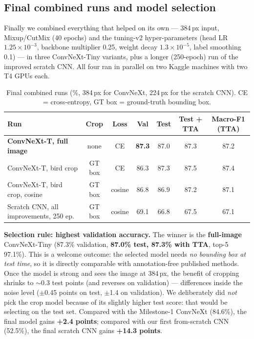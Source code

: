 \subsection{Final combined runs and model selection}\label{sec:finalruns}
Finally we combined everything that helped on its own --- 384\,px input, Mixup/CutMix (40 epochs) and the tuning-v2
hyper-parameters (head LR $1.25\!\times\!10^{-3}$, backbone multiplier 0.25, weight decay $1.3\!\times\!10^{-5}$, label smoothing 0.1)
--- in three ConvNeXt-Tiny variants, plus a longer (250-epoch) run of the improved scratch CNN. All four ran in parallel on
two Kaggle machines with two T4 GPUs each.

\begin{table}[H]\centering\small
\begin{tabular}{lcccccc}
\toprule
Run & Crop & Loss & \textbf{Val} & Test & Test + TTA & Macro-F1 (TTA)\\
\midrule
\textbf{ConvNeXt-T, full image} & none & CE & \textbf{87.3} & 87.0 & 87.3 & 87.2\\
ConvNeXt-T, bird crop & GT box & CE & 86.3 & 87.3 & 87.5 & 87.4\\
ConvNeXt-T, bird crop, cosine & GT box & cosine & 86.8 & 86.9 & 87.2 & 87.1\\
\midrule
Scratch CNN, all improvements, 250 ep. & GT box & cosine & 69.1 & 66.8 & 67.5 & 67.1\\
\bottomrule
\end{tabular}
\caption{Final combined runs (\%, 384\,px for ConvNeXt, 224\,px for the scratch CNN). CE = cross-entropy, GT box = ground-truth bounding box.}\label{tab:final}
\end{table}

\textbf{Selection rule: highest validation accuracy.} The winner is the \textbf{full-image} ConvNeXt-Tiny (87.3\% validation,
\textbf{87.0\% test, 87.3\% with TTA}, top-5 97.1\%). This is a welcome outcome: the selected model needs \emph{no bounding box at
test time}, so it is directly comparable with annotation-free published methods. Once the model is strong and sees the image at
384\,px, the benefit of cropping shrinks to $\sim$0.3 test points (and reverses on validation) --- differences inside the noise level
($\pm$0.45 points on test, $\pm$1.4 on validation). We deliberately did \emph{not} pick the crop model because of its slightly higher
test score: that would be selecting on the test set. Compared with the Milestone-1 ConvNeXt (84.6\%), the final model gains
\textbf{+2.4 points}; compared with our first from-scratch CNN (52.5\%), the final scratch CNN gains \textbf{+14.3 points}.

